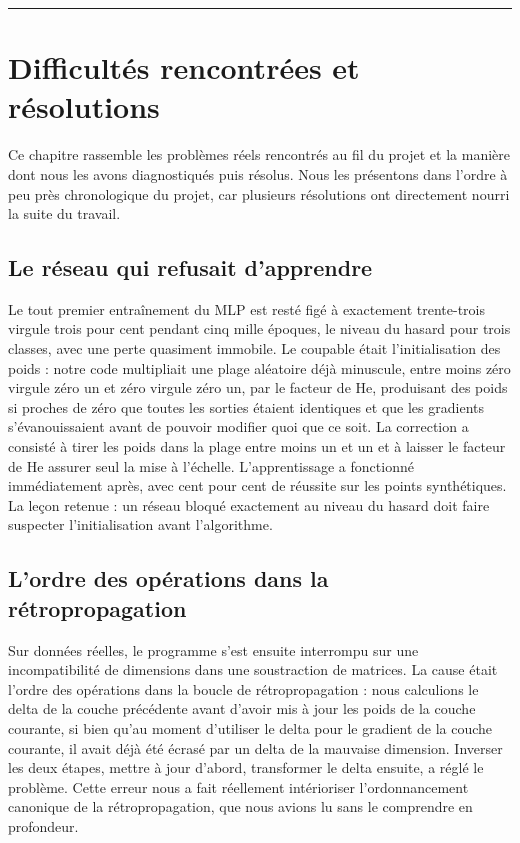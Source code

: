 \documentclass[11pt,a4paper]{report}
\begin{document}
\begin{center}\rule{0.5\linewidth}{0.5pt}\end{center}

\hypertarget{difficultuxe9s-rencontruxe9es-et-ruxe9solutions}{%
\chapter{Difficultés rencontrées et
résolutions}\label{difficultuxe9s-rencontruxe9es-et-ruxe9solutions}}

Ce chapitre rassemble les problèmes réels rencontrés au fil du projet et
la manière dont nous les avons diagnostiqués puis résolus. Nous les
présentons dans l'ordre à peu près chronologique du projet, car
plusieurs résolutions ont directement nourri la suite du travail.

\hypertarget{le-ruxe9seau-qui-refusait-dapprendre}{%
\section{Le réseau qui refusait
d'apprendre}\label{le-ruxe9seau-qui-refusait-dapprendre}}

Le tout premier entraînement du MLP est resté figé à exactement
trente-trois virgule trois pour cent pendant cinq mille époques, le
niveau du hasard pour trois classes, avec une perte quasiment immobile.
Le coupable était l'initialisation des poids : notre code multipliait
une plage aléatoire déjà minuscule, entre moins zéro virgule zéro un et
zéro virgule zéro un, par le facteur de He, produisant des poids si
proches de zéro que toutes les sorties étaient identiques et que les
gradients s'évanouissaient avant de pouvoir modifier quoi que ce soit.
La correction a consisté à tirer les poids dans la plage entre moins un
et un et à laisser le facteur de He assurer seul la mise à l'échelle.
L'apprentissage a fonctionné immédiatement après, avec cent pour cent de
réussite sur les points synthétiques. La leçon retenue : un réseau
bloqué exactement au niveau du hasard doit faire suspecter
l'initialisation avant l'algorithme.

\hypertarget{lordre-des-opuxe9rations-dans-la-ruxe9tropropagation}{%
\section{L'ordre des opérations dans la
rétropropagation}\label{lordre-des-opuxe9rations-dans-la-ruxe9tropropagation}}

Sur données réelles, le programme s'est ensuite interrompu sur une
incompatibilité de dimensions dans une soustraction de matrices. La
cause était l'ordre des opérations dans la boucle de rétropropagation :
nous calculions le delta de la couche précédente avant d'avoir mis à
jour les poids de la couche courante, si bien qu'au moment d'utiliser le
delta pour le gradient de la couche courante, il avait déjà été écrasé
par un delta de la mauvaise dimension. Inverser les deux étapes, mettre
à jour d'abord, transformer le delta ensuite, a réglé le problème. Cette
erreur nous a fait réellement intérioriser l'ordonnancement canonique de
la rétropropagation, que nous avions lu sans le comprendre en
profondeur.
\end{document}
